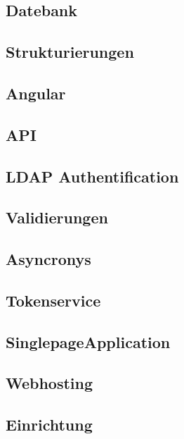 
    \subsection{Datebank}
        \lipsum[5-12]
    \subsection{Strukturierungen}
        \lipsum[5-12]
    \subsection{Angular}
        \lipsum[5-12]
    \subsection{API}
        \lipsum[5-12]
    \subsection{LDAP Authentification}
        \lipsum[5-12]
    \subsection{Validierungen}
        \lipsum[5-12]
    \subsection{Asyncronys}
        \lipsum[5-12]
    \subsection{Tokenservice}
        \lipsum[5-12]
    \subsection{SinglepageApplication}
        \lipsum[5-12]
    \subsection{Webhosting}
        \lipsum[5-12]
    \subsection{Einrichtung}
        \lipsum[5-12]